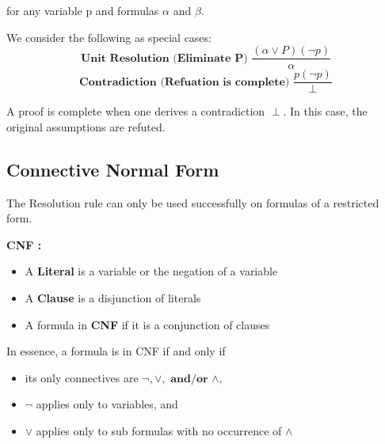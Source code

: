 \documentclass{article}
\begin{document}
for any variable p and formulas \(\alpha\) and \(\beta\).

We consider the following as special cases:
$$\textbf{Unit Resolution (Eliminate P) } \frac{(\alpha \vee P) (\neg p)}{\alpha} $$
$$\textbf{Contradiction (Refuation is complete) } \frac{p (\neg p)}{\perp} $$

A proof is complete when one derives a contradiction \(\perp\).
In this case, the original assumptions are refuted.

\subsection{Connective Normal Form}

The Resolution rule can only be used successfully on formulas of a
restricted form.

\textbf{CNF :}
\begin{itemize}
\item A \textbf{Literal} is a variable or the negation of a variable 
\item A \textbf{Clause} is a disjunction of literals
\item A formula in \textbf{CNF} if it is a conjunction of clauses
\end{itemize}

In essence, a formula is in CNF if and only if 
\begin{itemize}
\item its only connectives are \(\neg, \vee, \textbf{ and/or } \wedge,\)
\item \(\neg\) applies only to variables, and 
\item \(\vee\) applies only to sub formulas with no occurrence of \(\wedge\)
\end{itemize}
\end{document}
